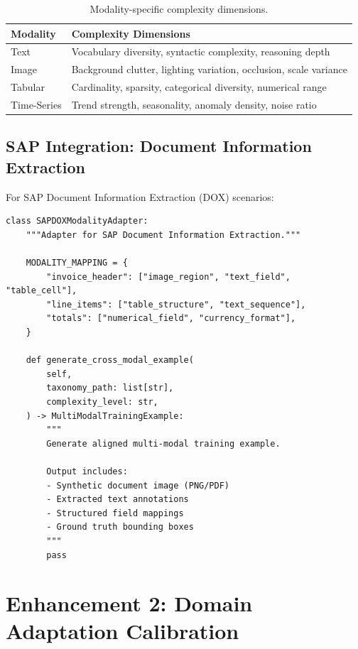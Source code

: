 \begin{table}[htbp]
\centering
\caption{Modality-specific complexity dimensions.}
\label{tab:modality-complexity}
\footnotesize
\begin{tabularx}{\textwidth}{@{}l X@{}}
\toprule
\textbf{Modality} & \textbf{Complexity Dimensions} \\
\midrule
Text & Vocabulary diversity, syntactic complexity, reasoning depth \\
Image & Background clutter, lighting variation, occlusion, scale variance \\
Tabular & Cardinality, sparsity, categorical diversity, numerical range \\
Time-Series & Trend strength, seasonality, anomaly density, noise ratio \\
\bottomrule
\end{tabularx}
\end{table}

\subsection{SAP Integration: Document Information Extraction}

For SAP Document Information Extraction (DOX) scenarios:

\begin{lstlisting}[language=jsonx,caption={SAP DOX multi-modal integration.}]
class SAPDOXModalityAdapter:
    """Adapter for SAP Document Information Extraction."""
    
    MODALITY_MAPPING = {
        "invoice_header": ["image_region", "text_field", "table_cell"],
        "line_items": ["table_structure", "text_sequence"],
        "totals": ["numerical_field", "currency_format"],
    }
    
    def generate_cross_modal_example(
        self,
        taxonomy_path: list[str],
        complexity_level: str,
    ) -> MultiModalTrainingExample:
        """
        Generate aligned multi-modal training example.
        
        Output includes:
        - Synthetic document image (PNG/PDF)
        - Extracted text annotations
        - Structured field mappings
        - Ground truth bounding boxes
        """
        pass
\end{lstlisting}


\section{Enhancement 2: Domain Adaptation Calibration}

